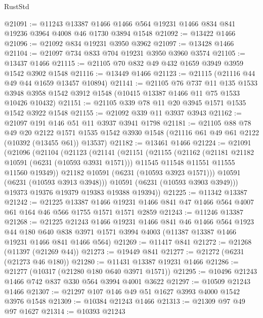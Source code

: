 \begin{lexlean}{RustStd}
\begin{coremodule}
{{@21091 := @11243
    @13387
    @1466
    @1466
    @564
    @19231
    @1466
    @834
    @841
    @19236
    @3964
    @4008
    @46
    @1730
    @3894
    @1548
@21092 := @13422 @1466
@21096 := @21092 @834 @19231 @3950 @3962
@21097 := @13428 @1466
@21104 := @21097 @734 @833 @704 @19231 @3950 @3960 @3574
@21105 := @13437 @1466
@21115 := @21105 @70 @832 @49 @432 @1659 @3949 @3959 @1542 @3902 @1548
@21116 := @13449 @1466
@21123 := @21115 (@21116 @44 @49 @44 @1659 @13457 @10894)
@21141 := @21105
    @76
    @737
    @11
    @135
    @1533
    @3948
    @3958
    @1542
    @3912
    @1548
    (@10415 @13387 @1466 @11 @75 @1533 @10426 @10432)
@21151 := @21105 @339 @78 @11 @20 @3945 @1571 @1535 @1542 @3922 @1548
@21155 := @21092 @339 @11 @3937 @3943
@21162 := @21097 @191 @146 @51 @11 @3937 @3941 @1798
@21181 := @21105
    @88
    @78
    @49
    @20
    @2122
    @1571
    @1535
    @1542
    @3930
    @1548
    (@21116 @61 @49 @61 @2122 (@10392 (@13455 @61)) @13537)
@21182 := @13461 @1466
@21224 := @21091
    (@21096
      (@21104
        (@21123
          (@21141
            (@21151
              (@21155
                (@21162
                  (@21181 @21182 @10591 (@6231 (@10593 @3931 @1571)))
                  @11545
                  @11548
                  @11551
                  @11555
                  @11560
                  @19349))
              @21182
              @10591
              (@6231 (@10593 @3923 @1571)))
            @10591
            (@6231 (@10593 @3913 @3948)))
          @10591
          (@6231 (@10593 @3903 @3949)))
        @19373
        @19376
        @19379
        @19383
        @19388
        @19394))
@21225 := @11342 @13387
@21242 := @21225
    @13387
    @1466
    @19231
    @1466
    @841
    @47
    @1466
    @564
    @4007
    @61
    @164
    @46
    @566
    @1755
    @1571
    @1571
    @2859
@21243 := @11246 @13387
@21268 := @21225
    @21243
    @1466
    @19231
    @1466
    @841
    @46
    @1466
    @564
    @1923
    @44
    @180
    @640
    @838
    @3971
    @1571
    @3994
    @4003
    (@11387 @13387 @1466 @19231 @1466 @841 @1466 @564)
@21269 := @11417 @841
@21272 := @21268 (@11397 (@21269 @44))
@21273 := @19449 @841
@21277 := @21272 (@6231 (@21273 @46 @180))
@21280 := @11431 @13387 @19231 @1466
@21286 := @21277 (@10317 (@21280 @180 @640 @3971 @1571))
@21295 := @10496 @21243 @1466 @742 @837 @330 @564 @3994 @4001 @3622
@21297 := @10509 @21243 @1466
@21307 := @21297 @107 @146 @49 @51 @1627 @3993 @4000 @1542 @3976 @1548
@21309 := @10384 @21243 @1466
@21313 := @21309 @97 @49 @97 @1627
@21314 := @10393 @21243
}}
\end{coremodule}
\end{lexlean}
